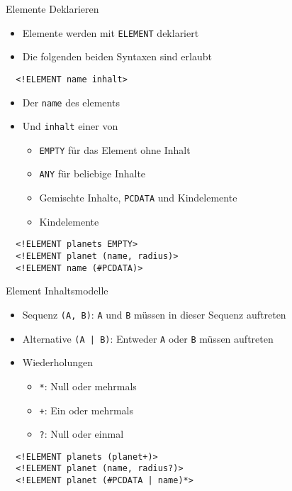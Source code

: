 \documentclass{beamer}
\begin{document}
\begin{frame}[fragile]{Elemente Deklarieren}
	
	\begin{itemize}
		\item Elemente werden mit \texttt{ELEMENT} deklariert
		\item Die folgenden beiden Syntaxen sind erlaubt
	\end{itemize}
	
	\lstset{language=XML}
	\begin{lstlisting}
  <!ELEMENT name inhalt>
	\end{lstlisting}
	
	\begin{itemize}
		\item Der \texttt{name} des elements
		\item Und \texttt{inhalt} einer von
		\begin{itemize}
			\item \texttt{EMPTY} für das Element ohne Inhalt
			\item \texttt{ANY} für beliebige Inhalte
			\item Gemischte Inhalte, \texttt{PCDATA} und Kindelemente
			\item Kindelemente
		\end{itemize}
	\end{itemize}
	
	\begin{lstlisting}
  <!ELEMENT planets EMPTY>
  <!ELEMENT planet (name, radius)>
  <!ELEMENT name (#PCDATA)>
	\end{lstlisting}
		
\end{frame}

\begin{frame}[fragile]{Element Inhaltsmodelle}
	
	\begin{itemize}
		\item Sequenz \texttt{(A, B)}: \texttt{A} und \texttt{B} müssen in dieser Sequenz auftreten
		\item Alternative \texttt{(A | B)}: Entweder \texttt{A} oder \texttt{B} müssen auftreten
		\item Wiederholungen
		\begin{itemize}
			\item \texttt{*}: Null oder mehrmals
			\item \texttt{+}: Ein oder mehrmals
			\item \texttt{?}: Null oder einmal
		\end{itemize}
	\end{itemize}
	
	\begin{lstlisting}
  <!ELEMENT planets (planet+)>
  <!ELEMENT planet (name, radius?)>
  <!ELEMENT planet (#PCDATA | name)*>
	\end{lstlisting}
	
\end{frame}
\end{document}
